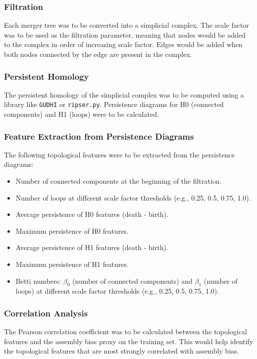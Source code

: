 \documentclass[twocolumn]{aastex631}
\begin{document}
\subsubsection{Filtration}
Each merger tree was to be converted into a simplicial complex. The scale factor was to be used as the filtration parameter, meaning that nodes would be added to the complex in order of increasing scale factor. Edges would be added when both nodes connected by the edge are present in the complex.

\subsubsection{Persistent Homology}
The persistent homology of the simplicial complex was to be computed using a library like \texttt{GUDHI} or \texttt{ripser.py}. Persistence diagrams for H0 (connected components) and H1 (loops) were to be calculated.

\subsubsection{Feature Extraction from Persistence Diagrams}
The following topological features were to be extracted from the persistence diagrams:
\begin{itemize}
    \item Number of connected components at the beginning of the filtration.
    \item Number of loops at different scale factor thresholds (e.g., 0.25, 0.5, 0.75, 1.0).
    \item Average persistence of H0 features (death - birth).
    \item Maximum persistence of H0 features.
    \item Average persistence of H1 features (death - birth).
    \item Maximum persistence of H1 features.
    \item Betti numbers: $\beta_0$ (number of connected components) and $\beta_1$ (number of loops) at different scale factor thresholds (e.g., 0.25, 0.5, 0.75, 1.0).
\end{itemize}

\subsubsection{Correlation Analysis}
The Pearson correlation coefficient was to be calculated between the topological features and the assembly bias proxy on the training set. This would help identify the topological features that are most strongly correlated with assembly bias.
\end{document}
